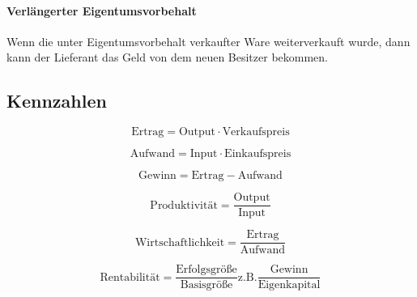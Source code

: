 \documentclass[../main.tex]{subfiles}
\begin{document}
            \paragraph{Verlängerter Eigentumsvorbehalt}
                Wenn die unter Eigentumsvorbehalt verkaufter Ware weiterverkauft wurde, dann kann der Lieferant das Geld von dem neuen Besitzer bekommen.
                
        \subsection{Kennzahlen}
            \begin{equation}
                \text{Ertrag} = \text{Output} \cdot \text{Verkaufspreis}
            \end{equation}

            \begin{equation}
                \text{Aufwand} = \text{Input} \cdot \text{Einkaufspreis}
            \end{equation}

            \begin{equation}
                \text{Gewinn} = \text{Ertrag} - \text{Aufwand}
            \end{equation}
            
            \begin{equation}
                \text{Produktivität} = \frac{\text{Output}}{\text{Input}}
            \end{equation}
            
            \begin{equation}
                \text{Wirtschaftlichkeit} = \frac{\text{Ertrag}}{\text{Aufwand}}
            \end{equation}
            
            \begin{equation}
                \text{Rentabilität} = \frac{\text{Erfolgsgröße}}{\text{Basisgröße}} \text{z.B.} \frac{\text{Gewinn}}{\text{Eigenkapital}}
            \end{equation}
            
\end{document}
